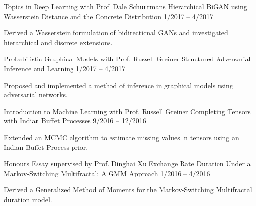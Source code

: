 \begin{cventries}
  \cventry
    {Topics in Deep Learning with Prof. Dale Schuurmans}
    {Hierarchical BiGAN using Wasserstein Distance and
the Concrete Distribution}
    {1/2017 -- 4/2017}
    {
      \begin{cvitems}
        \item Derived a Wasserstein formulation of bidirectional GANs and investigated hierarchical and discrete extensions.
      \end{cvitems}
    }
  \cventry
    {Probabilistic Graphical Models with Prof. Russell Greiner}
    {Structured Adversarial Inference and Learning}
    {1/2017 -- 4/2017}
    {
      \begin{cvitems}
        \item Proposed and implemented a method of inference in graphical models using adversarial networks.
      \end{cvitems}
    }
  \cventry
    {Introduction to Machine Learning with Prof. Russell Greiner}
    {Completing Tensors with Indian Buffet Processes}
    {9/2016 -- 12/2016}
    {
      \begin{cvitems}
		\item Extended an MCMC algorithm to estimate missing values in tensors using an Indian Buffet Process prior.
      \end{cvitems}
    }
  \cventry
    {Honours Essay supervised by Prof. Dinghai Xu}
    {Exchange Rate Duration Under a Markov-Switching Multifractal: A GMM Approach}
    {1/2016 -- 4/2016}
    {
      \begin{cvitems}
      	\item Derived a Generalized Method of Moments for the Markov-Switching Multifractal duration model.
      \end{cvitems}
    }
\end{cventries}

